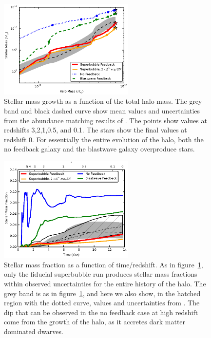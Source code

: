 \begin{figure}
    \includegraphics[width=0.6\textwidth]{figures2/mass_growth.eps}
    \caption[Stellar mass growth for different feedback models]{Stellar mass
    growth as a function of the total halo mass.  The grey band and black dashed
    curve show mean values and uncertainties from the abundance matching results
    of \citet{Behroozi2013}.  The points show values at redshifts 3,2,1,0.5, and
    0.1.  The stars show the final values at redshift 0.  For essentially the
    entire evolution of the halo, both the no feedback galaxy and the blastwave
    galaxy overproduce stars.}
    \label{mass_growth2}
\end{figure}
\begin{figure}
    \includegraphics[width=0.6\textwidth]{figures2/stellar_fraction.eps}
    \caption[Stellar mass fraction evolution]{Stellar mass fraction as a
    function of time/redshift.  As in figure~\ref{mass_growth2}, only the
    fiducial superbubble run produces stellar mass fractions within observed
    uncertainties for the entire history of the halo. The grey band is as in
    figure~\ref{mass_growth2}, and here we also show, in the hatched region with
    the dotted curve, values and uncertainties from \citet{Moster2013}.  The dip
    that can be observed in the no feedback case at high redshift come from the
    growth of the halo, as it accretes dark matter dominated dwarves.}
    \label{stellar_fraction2}
\end{figure}
